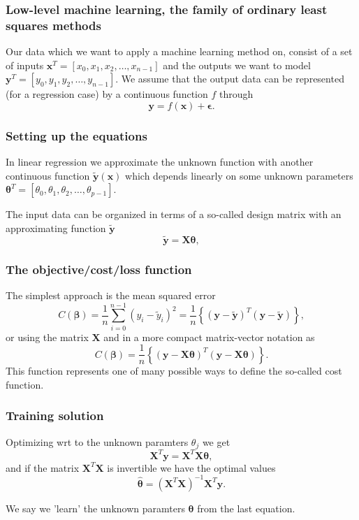 \documentclass{beamer}
\begin{document}
\begin{frame}
\frametitle{Low-level machine learning, the family of ordinary least squares methods}

Our data which we want to apply a machine learning method on, consist
of a set of inputs $\bm{x}^T=[x_0,x_1,x_2,\dots,x_{n-1}]$ and the
outputs we want to model $\bm{y}^T=[y_0,y_1,y_2,\dots,y_{n-1}]$.
We assume  that the output data can be represented (for a regression case) by a continuous function $f$
through
\[
\bm{y}=f(\bm{x})+\bm{\epsilon}.
\]
\end{frame}

\begin{frame}
\frametitle{Setting up the equations}

In linear regression we approximate the unknown function with another
continuous function $\tilde{\bm{y}}(\bm{x})$ which depends linearly on
some unknown parameters
$\bm{\theta}^T=[\theta_0,\theta_1,\theta_2,\dots,\theta_{p-1}]$.

The input data can be organized in terms of a so-called design matrix 
with an approximating function $\bm{\tilde{y}}$ 
\[
\bm{\tilde{y}}= \bm{X}\bm{\theta},
\]
\end{frame}

\begin{frame}
\frametitle{The objective/cost/loss function}

The  simplest approach is the mean squared error
\[
C(\bm{\beta})=\frac{1}{n}\sum_{i=0}^{n-1}\left(y_i-\tilde{y}_i\right)^2=\frac{1}{n}\left\{\left(\bm{y}-\bm{\tilde{y}}\right)^T\left(\bm{y}-\bm{\tilde{y}}\right)\right\},
\]
or using the matrix $\bm{X}$ and in a more compact matrix-vector notation as
\[
C(\bm{\beta})=\frac{1}{n}\left\{\left(\bm{y}-\bm{X}\bm{\theta}\right)^T\left(\bm{y}-\bm{X}\bm{\theta}\right)\right\}.
\]
This function represents one of many possible ways to define the so-called cost function.
\end{frame}

\begin{frame}
\frametitle{Training solution}

Optimizing wrt to the unknown paramters $\theta_j$ we get 
\[
\bm{X}^T\bm{y} = \bm{X}^T\bm{X}\bm{\theta},  
\]
and if the matrix $\bm{X}^T\bm{X}$ is invertible we have the optimal values
\[
\hat{\bm{\theta}} =\left(\bm{X}^T\bm{X}\right)^{-1}\bm{X}^T\bm{y}.
\]

We say we 'learn' the unknown paramters $\bm{\theta}$ from the last equation.
\end{frame}
\end{document}
